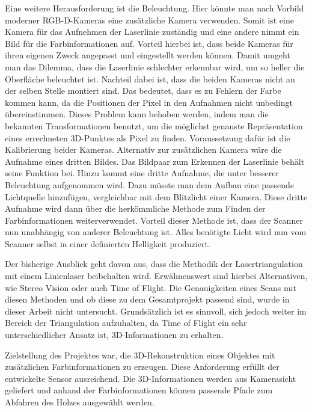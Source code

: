 	Eine weitere Herausforderung ist die Beleuchtung. Hier könnte man nach Vorbild moderner RGB-D-Kameras eine zusätzliche Kamera verwenden. Somit ist eine Kamera für das Aufnehmen der Laserlinie zuständig und eine andere nimmt ein Bild für die Farbinformationen auf. Vorteil hierbei ist, dass beide Kameras für ihren eigenen Zweck angepasst und eingestellt werden können. Damit umgeht man das Dilemma, dass die Laserlinie schlechter erkennbar wird, um so heller die Oberfläche beleuchtet ist. Nachteil dabei ist, dass die beiden Kameras nicht an der selben Stelle montiert sind. Das bedeutet, dass es zu Fehlern der Farbe kommen kann, da die Positionen der Pixel in den Aufnahmen nicht unbedingt übereinstimmen. Dieses Problem kann behoben werden, indem man die bekannten Transformationen benutzt, um die möglichst genauste Repräsentation eines errechneten 3D-Punktes als Pixel zu finden. Voraussetzung dafür ist die Kalibrierung beider Kameras. Alternativ zur zusätzlichen Kamera wäre die Aufnahme eines dritten Bildes. Das Bildpaar zum Erkennen der Laserlinie behält seine Funktion bei. Hinzu kommt eine dritte Aufnahme, die unter besserer Beleuchtung aufgenommen wird. Dazu müsste man dem Aufbau eine passende Lichtquelle hinzufügen, vergleichbar mit dem Blitzlicht einer Kamera. Diese dritte Aufnahme wird dann über die herkömmliche Methode zum Finden der Farbinformationen weiterverwendet. Vorteil dieser Methode ist, dass der Scanner nun unabhängig von anderer Beleuchtung ist. Alles benötigte Licht wird nun vom Scanner selbst in einer definierten Helligkeit produziert.
	
	Der bisherige Ausblick geht davon aus, dass die Methodik der Lasertriangulation mit einem Linienlaser beibehalten wird. Erwähnenswert sind hierbei Alternativen, wie Stereo Vision oder auch Time of Flight. Die Genauigkeiten eines Scans mit diesen Methoden und ob diese zu dem Gesamtprojekt passend sind, wurde in dieser Arbeit nicht untersucht. Grundsätzlich ist es sinnvoll, sich jedoch weiter im Bereich der Triangulation aufzuhalten, da Time of Flight ein sehr unterschiedlicher Ansatz ist, 3D-Informationen zu erhalten.
	
	Zielstellung des Projektes war, die 3D-Rekonstruktion eines Objektes mit zusätzlichen Farbinformationen zu erzeugen. Diese Anforderung erfüllt der entwickelte Sensor ausreichend. Die 3D-Informationen werden aus Kamerasicht geliefert und anhand der Farbinformationen können passende Pfade zum Abfahren des Holzes ausgewählt werden.